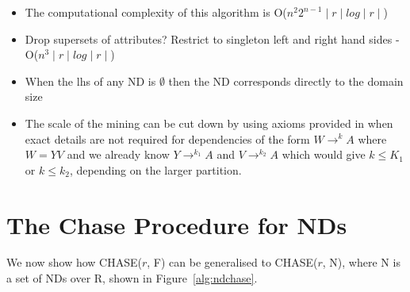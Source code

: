 \begin{itemize}
\item The computational complexity of this algorithm is O($n^2 2^{n-1}
\mid r \mid log \mid r \mid$)
\item Drop supersets of attributes? Restrict to singleton left and right
hand sides - O($n^3\mid r \mid log \mid r \mid$)
\item When the lhs of any ND is $\emptyset$ then the ND corresponds
directly to the domain size
\item The scale of the mining can be cut down by using axioms provided
in \cite{gm85b,gm85a} when exact details are not required for
dependencies of the form $W \to^k A$ where $W = YV$ and we already
know $Y \to^{k_1} A$ and $V \to^{k_2} A$ which would give $k \le K_1$
or $k \le k_2$, depending on the larger partition.
\end{itemize}
 

\section{The Chase Procedure for NDs}

We now show how CHASE($r$, F) can be generalised to CHASE($r$, N), where N is
a set of NDs over R, shown in Figure~\ref{alg:ndchase}.

